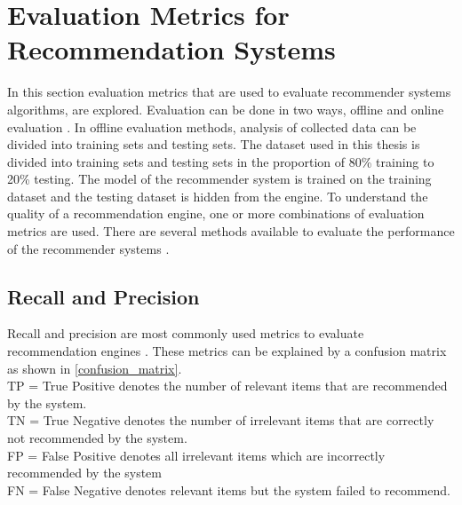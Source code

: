 
\section{Evaluation Metrics for Recommendation Systems}
\label{sec:eval_metrics}

In this section evaluation metrics that are used to evaluate recommender systems algorithms, are explored. Evaluation can be done in two ways, offline and online evaluation \cite{22,23}. In offline evaluation methods, analysis of collected data can be divided into training sets and testing sets. The dataset used in this thesis is divided into training sets and testing sets in the proportion of 80\% training to 20\% testing. The model of the recommender system is trained on the training dataset and the testing dataset is hidden from the engine. To understand the quality of a recommendation engine, one or more combinations of evaluation metrics are used. There are several methods available to evaluate the performance of the recommender systems \cite{22,24}.

\subsection{Recall and Precision}
\label{sec:recall_precision}
Recall and precision are most commonly used metrics to evaluate recommendation engines \cite{25}. These metrics can be explained by a confusion matrix \cite{21} as shown in \autoref{confusion_matrix}. \\
\noindent
TP = True Positive denotes the number of relevant items that are recommended by the system.\\
TN = True Negative denotes the number of irrelevant items that are correctly not recommended by the system.  \\
FP = False Positive denotes all irrelevant items which are incorrectly recommended by the system\\
FN = False Negative denotes relevant items but the system failed to recommend.\\

